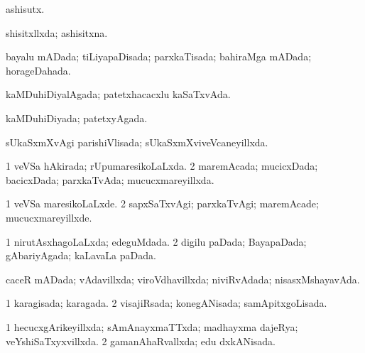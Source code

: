 {\bentry
{} 
\gl{\nA}
\expl{}
\bmng
 ashisutx.\eng{ } 
\emng
\eentry

\bentry
{} 
\gl{\gu}
\expl{}
\bmng
 shisitxllxda; ashisitxna. 
\emng
\eentry

\bentry
{} 
\gl{\gu}
\expl{}
\bmng
 bayalu mADada; tiLiyapaDisada; parxkaTisada; bahiraMga mADada; horageDahada. 
\emng
\eentry

\bentry
{} 
\gl{\gu}
\expl{}
\bmng
 kaMDuhiDiyalAgada; patetxhacacxlu kaSaTxvAda. 
\emng
\eentry

\bentry
{} 
\gl{\gu}
\expl{}
\bmng
 kaMDuhiDiyada; patetxyAgada. 
\emng
\eentry

\bentry
{} 
\gl{\gu}
\expl{}
\bmng
 sUkaSxmXvAgi parishiVlisada; sUkaSxmXviveVcaneyillxda. 
\emng
\eentry

\bentry
{} 
\gl{\gu}
\expl{}
\bmng
\bnum
\num{1} veVSa hAkirada; rUpumaresikoLaLxda. 
\num{2} maremAcada; mucicxDada; bacicxDada; parxkaTvAda; mucucxmareyillxda. 
\enum
\emng
\eentry

\bentry
{} 
\gl{\kirxvi}
\expl{}
\bmng
\bnum
\num{1} veVSa maresikoLaLxde. 
\num{2} sapxSaTxvAgi; parxkaTvAgi; maremAcade; mucucxmareyillxde. 
\enum
\emng
\eentry

\bentry
{} 
\gl{\gu}
\expl{}
\bmng
\bnum
\num{1} nirutAsxhagoLaLxda; edeguMdada. 
\num{2} digilu paDada; BayapaDada; gAbariyAgada; kaLavaLa paDada. 
\enum
\emng
\eentry

\bentry
{} 
\gl{\gu}
\expl{}
\bmng
 caceR mADada; vAdavillxda; viroVdhavillxda; niviRvAdada; nisasxMshayavAda. 
\emng
\eentry

\bentry
{} 
\gl{\gu}
\expl{}
\bmng
\bnum
\num{1} karagisada; karagada. 
\num{2} visajiRsada; konegANisada; samApitxgoLisada. 
\enum
\emng
\eentry

\bentry
{} 
\gl{\gu}
\expl{}
\bmng
\emng
\eentry

\bentry
{} 
\gl{\gu}
\expl{}
\bmng
\bnum
\num{1} hecucxgArikeyillxda; sAmAnayxmaTTxda; madhayxma dajeRya; veYshiSaTxyxvillxda. 
\num{2} gamanAhaRvallxda; edu dxkANisada. 
\enum
\emng
\eentry

}
